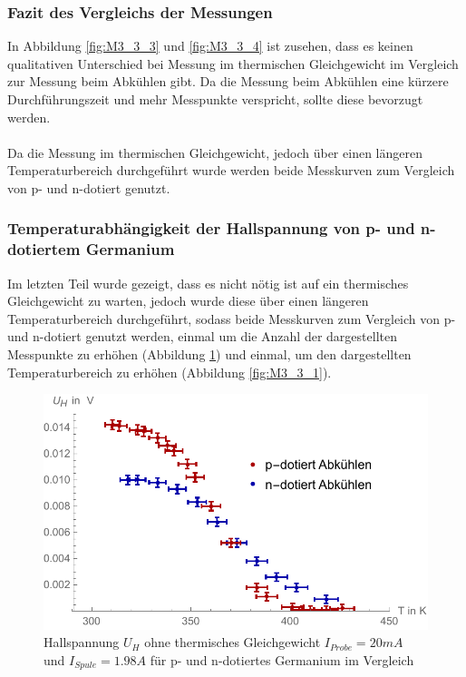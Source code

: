 \subsubsection{Fazit des Vergleichs der Messungen}
In Abbildung \ref{fig:M3_3_3} und \ref{fig:M3_3_4} ist zusehen, dass es keinen qualitativen Unterschied bei Messung im thermischen Gleichgewicht im Vergleich zur Messung beim Abkühlen gibt. Da die Messung beim Abkühlen eine kürzere Durchführungszeit und mehr Messpunkte verspricht, sollte diese bevorzugt werden.\\
\\
Da die Messung im thermischen Gleichgewicht, jedoch über einen längeren Temperaturbereich durchgeführt wurde werden beide Messkurven zum Vergleich von p- und n-dotiert genutzt.

\subsubsection{Temperaturabhängigkeit der Hallspannung von p- und n-dotiertem Germanium}
Im letzten Teil wurde gezeigt, dass es nicht nötig ist auf ein thermisches Gleichgewicht zu warten, jedoch wurde diese über einen längeren Temperaturbereich durchgeführt, sodass beide Messkurven zum Vergleich von p- und n-dotiert genutzt werden, einmal um die Anzahl der dargestellten Messpunkte zu erhöhen (Abbildung \ref{fig:M3_3_2}) und einmal, um den dargestellten Temperaturbereich zu erhöhen (Abbildung \ref{fig:M3_3_1}).\\

\begin{figure}[H]
	\centering
\includegraphics[width=0.9\linewidth]{IMAGE/M33_np_Abkuehl.pdf}
	\caption{Hallspannung $U_{H}$ ohne thermisches Gleichgewicht $I_{Probe}=20mA$ und $I_{Spule}=1.98A$ für p- und n-dotiertes Germanium im Vergleich}
	\label{fig:M3_3_2}
\end{figure} 


